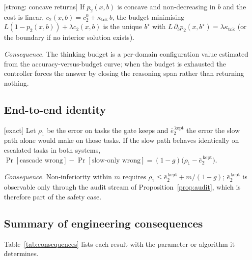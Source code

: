 \begin{proposition} \textnormal{[strong: concave returns]}
\label{prop:budget}
If $p_2(x,b)$ is concave and non-decreasing in $b$ and the cost is linear,
$c_2(x,b)=c_2^0+\kappa_{\text{tok}}\,b$, the budget minimising
$L(1-p_2(x,b))+\lambda c_2(x,b)$ is the unique $b^\star$ with
$L\,\partial_bp_2(x,b^\star)=\lambda\kappa_{\text{tok}}$ (or the boundary if
no interior solution exists).
\end{proposition}
\emph{Consequence.} The thinking budget is a per-domain configuration value
estimated from the accuracy-versus-budget curve;
when the budget is exhausted the controller forces the answer by closing the
reasoning span \cite{muennighoff2025s1} rather than returning nothing.

\subsection{End-to-end identity}

\begin{proposition} \textnormal{[exact]}
\label{prop:cascade}
Let $\rho_1$ be the error on tasks the gate keeps and $\bar e_2^{\,\text{kept}}$
the error the slow path alone would make on those tasks. If the slow path
behaves identically on escalated tasks in both systems,
$\Pr[\text{cascade wrong}]-\Pr[\text{slow-only wrong}]
=(1-g)\big(\rho_1-\bar e_2^{\,\text{kept}}\big)$.
\end{proposition}
\emph{Consequence.} Non-inferiority within $m$ requires
$\rho_1\le\bar e_2^{\,\text{kept}}+m/(1-g)$; $\bar e_2^{\,\text{kept}}$ is
observable only through the audit stream of Proposition~\ref{prop:audit}, which
is therefore part of the safety case.

\subsection{Summary of engineering consequences}
Table~\ref{tab:consequences} lists each result with the parameter or
algorithm it determines.

